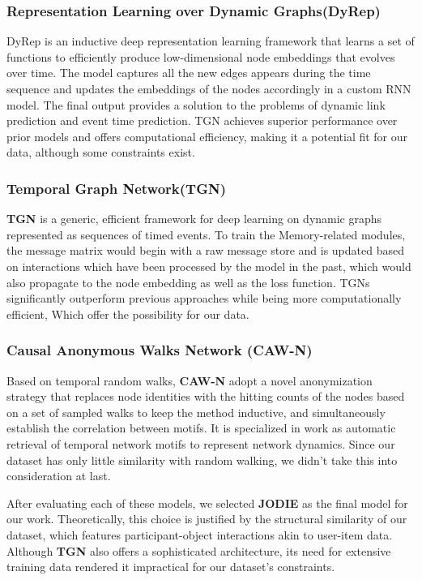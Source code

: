 \subsubsection{Representation Learning over Dynamic Graphs(DyRep)}
DyRep\cite{trivedi2018representation} is an inductive deep representation learning framework that learns a set of functions to efficiently produce low-dimensional node embeddings that evolves over time. The model captures all the new edges appears during the time sequence and updates the embeddings of the nodes accordingly in a custom RNN model. The final output provides a solution to the problems of dynamic link prediction and event time prediction. TGN achieves superior performance over prior models and offers computational efficiency, making it a potential fit for our data, although some constraints exist.


\subsubsection{Temporal Graph Network(TGN)}
\textbf{TGN}\cite{rossi2006temporal} is a generic, efficient framework for deep learning on dynamic graphs represented as sequences of timed events. To train the Memory-related modules, the message matrix would begin with a raw message store and is updated based on interactions which have been processed by the model in the past, which would also propagate to the node embedding as well as the loss function. TGNs significantly outperform previous approaches while being more computationally efficient, Which offer the possibility for our data.

\subsubsection{Causal Anonymous Walks Network (CAW-N)}
Based on temporal random walks, \textbf{CAW-N} adopt a novel anonymization strategy that replaces node identities with the hitting counts of the nodes based on a set of sampled walks to keep the method inductive, and simultaneously establish the correlation between motifs. It is specialized in work as automatic retrieval of temporal network motifs to represent network dynamics. Since our dataset has only little similarity with random walking, we didn't take this into consideration at last.


After evaluating each of these models, we selected \textbf{JODIE} as the final model for our work. Theoretically, this choice is justified by the structural similarity of our dataset, which features participant-object interactions akin to user-item data. Although \textbf{TGN } also offers a sophisticated architecture, its need for extensive training data rendered it impractical for our dataset's constraints.